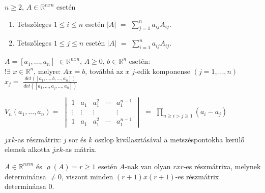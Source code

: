	\begin{frame}
		\begin{tcolorbox}[title={Tétel.: Kifejtési tétel}]
			$n \geq 2$, $A \in \mathbb{R}^{n x n}$ esetén\\
			
			\begin{enumerate}
    				\item Tetszőleges $1 \leq i \leq n$ esetén $|A|$ $=$ $\sum_{j = 1}^n a_{ij}A_{ij}$.
    				\item Tetszőleges $1 \leq j \leq n$ esetén $|A|$ $=$ $\sum_{i = 1}^n a_{ij}A_{ij}$.
    				\end{enumerate}
		\end{tcolorbox}	
		
		\begin{tcolorbox}[title={Tétel.: Cramer-szabály}]
			$A = [a_1, ..., a_n]$ $\in \mathbb{R}^{n x n}$, $A \geq 0$, $b \in \mathbb{R}^{n}$ esetén:\\
			
			 !$\exists$ $x \in \mathbb{R}^n$, melyre: $Ax = b$, továbbá az $x$ $j$-edik komponense $(j = 1, ..., n)$\\
			$x_j =$ $\frac{det([a_1, ..., b, ..., a_n])}{det([a_1, ..., a_j, ..., a_n])}$
		\end{tcolorbox}	
		
		\begin{tcolorbox}[title={Tétel.: Vandermonde-determináns, és kifejtése}]
			$V_n(a_1, ..., a_n) =$ $\begin{vmatrix} 
  				1 & a_1 & a_1^2 & \cdots & a_1^{n-1} \\
  				\vdots & \vdots  & \vdots & & \vdots\\
  				1 & a_1 & a_1^2 & \cdots & a_1^{n-1}
			\end{vmatrix}$ $=$ $\prod_{n \geq i > j \geq 1} (a_i - a_j)$
		\end{tcolorbox}	
		
		\begin{tcolorbox}[title={Def.: Részmátrix}]
			$j x k$-as részmátrix: $j$ sor és $k$ oszlop kiválasztásával a metszéspontokba kerülő elemek alkotta $j x k$-as mátrix.
		\end{tcolorbox}	
		
		\begin{tcolorbox}[title={Tétel: Részmátrix és determináns}]
			$A \in \mathbb{R}^{n x m}$ és ${\varrho}(A) = r \geq 1$ esetén $A$-nak van olyan $r x r$-es részmátrixa, melynek determinánsa $\neq 0$, viszont minden $(r + 1) x (r + 1)$-es részmátrix determinánsa $0$.
		\end{tcolorbox}	
	\end{frame}
	

